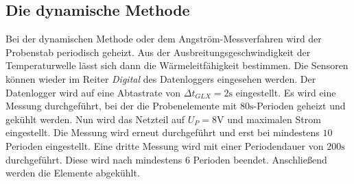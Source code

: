 \subsection{Die dynamische Methode}
\label{sec:dynamisch}
Bei der dynamischen Methode oder dem Angström-Messverfahren wird der Probenstab
periodisch geheizt. Aus der Ausbreitungsgeschwindigkeit der Temperaturwelle lässt sich
dann die Wärmeleitfähigkeit bestimmen. Die Sensoren können wieder im Reiter \textit{Digital}
des Datenloggers eingesehen werden. Der Datenlogger wird auf eine Abtastrate von
$\Delta t_{GLX} = 2 \si{\second}$ eingestellt. Es wird eine Messung durchgeführt,
bei der die Probenelemente mit $80 \si{\second}$-Perioden geheizt und gekühlt werden.
Nun wird das Netzteil auf $U_P = 8 \si{\volt}$ und maximalen Strom eingestellt.
Die Messung wird erneut durchgeführt und erst bei mindestens $10$ Perioden eingestellt.
Eine dritte Messung wird mit einer Periodendauer von $200 \si{\second}$ durchgeführt.
Diese wird nach mindestens $6$ Perioden beendet. Anschließend werden die Elemente abgekühlt.
